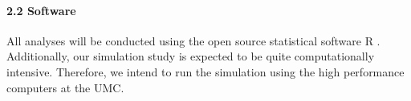 \documentclass[
  12pt,
]{article}
\begin{document}
\hypertarget{software}{%
\paragraph{\texorpdfstring{2.2\textbar{} Software\\
}{2.2\textbar{} Software }}\label{software}}

\hfill\break
All analyses will be conducted using the open source statistical
software R \autocite{base}. Additionally, our simulation study is
expected to be quite computationally intensive. Therefore, we intend to
run the simulation using the high performance computers at the UMC.

\newpage

\printbibliography
\end{document}

